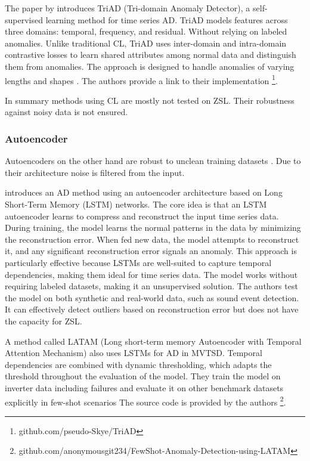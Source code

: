 The paper by \cite{sun_unraveling_2023} introduces TriAD (Tri-domain Anomaly Detector), a self-supervised learning method for time series AD. TriAD models features across three domains: temporal, frequency, and residual. Without relying on labeled anomalies. Unlike traditional CL, TriAD uses inter-domain and intra-domain contrastive losses to learn shared attributes among normal data and distinguish them from anomalies. The approach is designed to handle anomalies of varying lengths and shapes \cite{sun_unraveling_2023}. The authors provide a link to their implementation \footnote{\fussy\tiny github.com/pseudo-Skye/TriAD}.

In summary methods using CL are mostly not tested on ZSL. Their robustness against noisy data is not ensured.

\subsubsection{Autoencoder}
Autoencoders on the other hand are robust to unclean training datasets \cite[p. 2487]{abdulaal_practical_2021}. Due to their architecture noise is filtered from the input.

\cite{provotar_unsupervised_2019} introduces an AD method using an autoencoder architecture based on Long Short-Term Memory (LSTM) networks. The core idea is that an LSTM autoencoder learns to compress and reconstruct the input time series data. During training, the model learns the normal patterns in the data by minimizing the reconstruction error. When fed new data, the model attempts to reconstruct it, and any significant reconstruction error signals an anomaly. This approach is particularly effective because LSTMs are well-suited to capture temporal dependencies, making them ideal for time series data. The model works without requiring labeled datasets, making it an unsupervised solution. The authors test the model on both synthetic and real-world data, such as sound event detection. It can effectively detect outliers based on reconstruction error but does not have the capacity for ZSL.

A method called LATAM (Long short-term memory Autoencoder with Temporal Attention Mechanism) also uses LSTMs for AD in MVTSD. Temporal dependencies are combined with dynamic thresholding, which adapts the threshold throughout the evaluation of the model. They train the model on inverter data including failures and evaluate it on other benchmark datasets explicitly in few-shot scenarios \cite{nivarthi_towards_2023} The source code is provided by the authors \footnote{\fussy\tiny github.com/anonymousgit234/FewShot-Anomaly-Detection-using-LATAM}.

